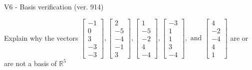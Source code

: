 \begin{exercise}
  \begin{exerciseTitle}V6 - Basis verification (ver. 914)\end{exerciseTitle}
  \begin{exerciseStatement}
    Explain why the vectors \(\left[\begin{array}{r}
-1 \\
0 \\
3 \\
-3 \\
-3
\end{array}\right] , \left[\begin{array}{r}
2 \\
-5 \\
-4 \\
-1 \\
3
\end{array}\right] , \left[\begin{array}{r}
1 \\
-5 \\
-2 \\
4 \\
-4
\end{array}\right] , \left[\begin{array}{r}
-3 \\
1 \\
1 \\
3 \\
-4
\end{array}\right] , \text{ and } \left[\begin{array}{r}
4 \\
-2 \\
-4 \\
4 \\
1
\end{array}\right]\) are or are not a basis of \(\mathbb{R}^5\)	



\end{exerciseStatement}
\end{exercise}
